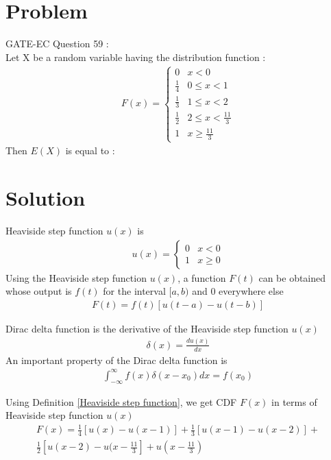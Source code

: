 \documentclass[journal,12pt,twocolumn]{IEEEtran}
\begin{document}
\section*{\textbf{Problem}}
GATE-EC Question 59 : \\
Let X be a random variable having the distribution function :
\begin{align*}
F(x)=   
\begin{cases}
0 & x<0 \\
\frac{1}{4} & 0\le x<1 \\
\frac{1}{3} & 1\le x<2 \\
\frac{1}{2} & 2\le x<\frac{11}{3} \\
1 & x\ge\frac{11}{3}
\end{cases}
\end{align*}
Then $E(X)$ is equal to :
\section*{\textbf{Solution}}
\begin{definition}
\label{Heaviside step function}
Heaviside step function $u(x)$ is 
\begin{align*}
u(x)=                
    \begin{cases}
    0 & x<0 \\
    1 & x\geq 0
    \end{cases}
\end{align*}
Using the Heaviside step function $u(x)$, a function $F(t)$ can be obtained whose output is $f(t)$ for the interval $[a,b)$ and $0$ everywhere else
\begin{align*}
    F(t)=f(t)[u(t-a) - u(t-b)] 
\end{align*}
\end{definition}
\begin{definition}
\label{Dirac delta function}
Dirac delta function is the derivative of the Heaviside step function $u(x)$
\begin{align*}
    \delta(x) = \frac{du(x)}{dx} 
\end{align*}
An important property of the Dirac delta function is 
\begin{align*}
    \int_{-\infty}^{\infty}f(x)\delta(x-x_0)dx = f(x_0) 
\end{align*}
\end{definition}
Using Definition \ref{Heaviside step function}, we get CDF $F(x)$ in terms of Heaviside step function $u(x)$
\begin{multline*}
F(x)=\frac{1}{4}[u(x)-u(x-1)]+\frac{1}{3}[u(x-1)-u(x-2)]+\\
\frac{1}{2}[u(x-2)-u(x-\frac{11}{3}]+u(x-\frac{11}{3})
\end{multline*}
\end{document}
